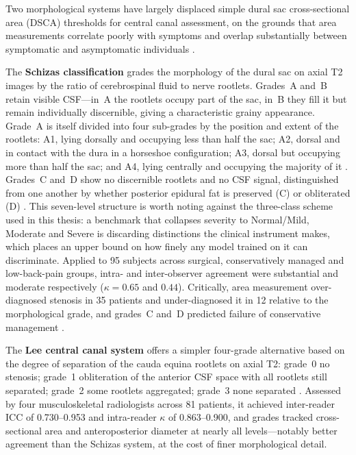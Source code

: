 Two morphological systems have largely displaced simple dural sac
cross-sectional area (DSCA) thresholds for central canal assessment, on the
grounds that area measurements correlate poorly with symptoms and overlap
substantially between symptomatic and asymptomatic individuals
\cite{schizas2010qualitative}.

The \textbf{Schizas classification} grades the morphology of the dural sac on
axial T2 images by the ratio of cerebrospinal fluid to nerve rootlets. Grades~A
and~B retain visible CSF---in~A the rootlets occupy part of the sac, in~B they
fill it but remain individually discernible, giving a characteristic grainy
appearance. Grade~A is itself divided into four sub-grades by the position and
extent of the rootlets: A1, lying dorsally and occupying less than half the sac;
A2, dorsal and in contact with the dura in a horseshoe configuration; A3, dorsal
but occupying more than half the sac; and A4, lying centrally and occupying the
majority of it \cite{schizas2010qualitative}. Grades~C and~D show no discernible
rootlets and no CSF signal, distinguished from one another by whether posterior
epidural fat is preserved (C) or obliterated (D)
\cite{schizas2010qualitative}. This seven-level structure is worth noting
against the three-class scheme used in this thesis: a benchmark that collapses
severity to Normal/Mild, Moderate and Severe is discarding distinctions the
clinical instrument makes, which places an upper bound on how finely any model
trained on it can discriminate. Applied to 95 subjects
across surgical, conservatively managed and low-back-pain groups, intra- and
inter-observer agreement were substantial and moderate respectively
($\kappa = 0.65$ and $0.44$). Critically, area measurement over-diagnosed
stenosis in 35 patients and under-diagnosed it in 12 relative to the
morphological grade, and grades~C and~D predicted failure of conservative
management \cite{schizas2010qualitative}.

The \textbf{Lee central canal system} offers a simpler four-grade alternative
based on the degree of separation of the cauda equina rootlets on axial T2:
grade~0 no stenosis; grade~1 obliteration of the anterior CSF space with all
rootlets still separated; grade~2 some rootlets aggregated; grade~3 none
separated \cite{lee2011a}. Assessed by four musculoskeletal radiologists across
81 patients, it achieved inter-reader ICC of 0.730--0.953 and intra-reader
$\kappa$ of 0.863--0.900, and grades tracked cross-sectional area and
anteroposterior diameter at nearly all levels---notably better agreement than
the Schizas system, at the cost of finer morphological detail.

